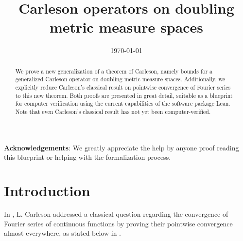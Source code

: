 
%
%

\title{Carleson operators on doubling metric measure spaces}

\date{\today}

\begin{abstract}
    We prove a new generalization of a theorem of Carleson, namely bounds for a generalized Carleson operator on doubling metric measure spaces.
    Additionally, we explicitly reduce Carleson's classical result on pointwise convergence of Fourier series to this new theorem.
    Both proofs are presented in great detail, suitable as a blueprint for computer verification using the current capabilities of the software package Lean.
    Note that even Carleson's classical result has not yet been computer-verified.
\end{abstract}

\maketitle

\tableofcontents

\textbf{Acknowledgements}: We greatly appreciate the help by anyone proof reading this blueprint or helping with the formalization process.

\chapter{Introduction}

In \cite{carleson}, L. Carleson addressed a classical question regarding the convergence of Fourier series of continuous functions by proving their pointwise convergence almost everywhere, as stated below in .

